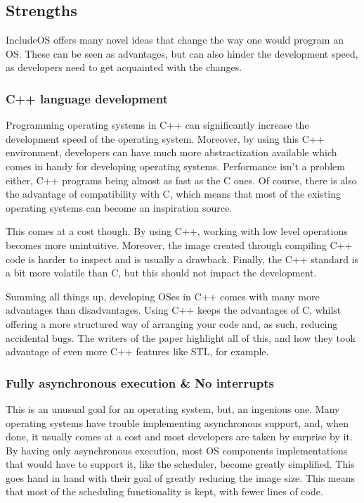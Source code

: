 \documentclass[12pt]{article}
\begin{document}
\subsection{Strengths}
IncludeOS offers many novel ideas that change the way one would program an OS. These can be seen as advantages, but can also hinder
the development speed, as developers need to get acquainted with the changes.

\subsubsection{C++ language development}
Programming operating systems in C++ can significantly increase the development speed of the operating system. Moreover, by using this
C++ environment, developers can have much more abstractization available which comes in handy for developing operating systems. Performance
isn't a problem either, C++ programs being almost as fast as the C ones. Of course, there is also the advantage of compatibility with C,
which means that most of the existing operating systems can become an inspiration source.

This comes at a cost though. By using C++, working with low level operations becomes more unintuitive. Moreover, the image created through
compiling C++ code is harder to inspect and is usually a drawback. Finally, the C++ standard is a bit more volatile than C, but this should
not impact the development.

Summing all things up, developing OSes in C++ comes with many more advantages than disadvantages. Using C++ keeps the advantages of C,
whilst offering a more structured way of arranging your code and, as such, reducing accidental bugs. The writers of the paper highlight
all of this, and how they took advantage of even more C++ features like STL, for example.

\subsubsection{Fully asynchronous execution \& No interrupts}
This is an unusual goal for an operating system, but, an ingenious one. Many operating systems have trouble implementing asynchronous
support, and, when done, it usually comes at a cost and most developers are taken by surprise by it. By having only asynchronous execution,
most OS components implementations that would have to support it, like the scheduler, become greatly simplified. This goes hand in hand
with their goal of greatly reducing the image size. This means that most of the scheduling functionality is kept, with fewer lines of code.
\end{document}
